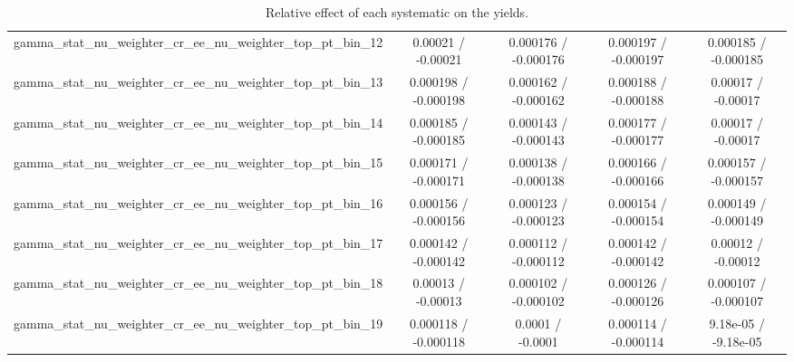\documentclass[10pt]{article}
\begin{document}
\begin{table}[htbp]
\begin{center}
\begin{tabular}{|c|c|c|c|c|}
  gamma_stat_nu_weighter_cr_ee_nu_weighter_top_pt_bin_12 & 0.00021 / -0.00021 & 0.000176 / -0.000176 & 0.000197 / -0.000197 & 0.000185 / -0.000185 \\ 
  gamma_stat_nu_weighter_cr_ee_nu_weighter_top_pt_bin_13 & 0.000198 / -0.000198 & 0.000162 / -0.000162 & 0.000188 / -0.000188 & 0.00017 / -0.00017 \\ 
  gamma_stat_nu_weighter_cr_ee_nu_weighter_top_pt_bin_14 & 0.000185 / -0.000185 & 0.000143 / -0.000143 & 0.000177 / -0.000177 & 0.00017 / -0.00017 \\ 
  gamma_stat_nu_weighter_cr_ee_nu_weighter_top_pt_bin_15 & 0.000171 / -0.000171 & 0.000138 / -0.000138 & 0.000166 / -0.000166 & 0.000157 / -0.000157 \\ 
  gamma_stat_nu_weighter_cr_ee_nu_weighter_top_pt_bin_16 & 0.000156 / -0.000156 & 0.000123 / -0.000123 & 0.000154 / -0.000154 & 0.000149 / -0.000149 \\ 
  gamma_stat_nu_weighter_cr_ee_nu_weighter_top_pt_bin_17 & 0.000142 / -0.000142 & 0.000112 / -0.000112 & 0.000142 / -0.000142 & 0.00012 / -0.00012 \\ 
  gamma_stat_nu_weighter_cr_ee_nu_weighter_top_pt_bin_18 & 0.00013 / -0.00013 & 0.000102 / -0.000102 & 0.000126 / -0.000126 & 0.000107 / -0.000107 \\ 
  gamma_stat_nu_weighter_cr_ee_nu_weighter_top_pt_bin_19 & 0.000118 / -0.000118 & 0.0001 / -0.0001 & 0.000114 / -0.000114 & 9.18e-05 / -9.18e-05 \\ 
\hline 
\end{tabular} 
\caption{Relative effect of each systematic on the yields.} 
\end{center} 
\end{table} 
\end{document}
